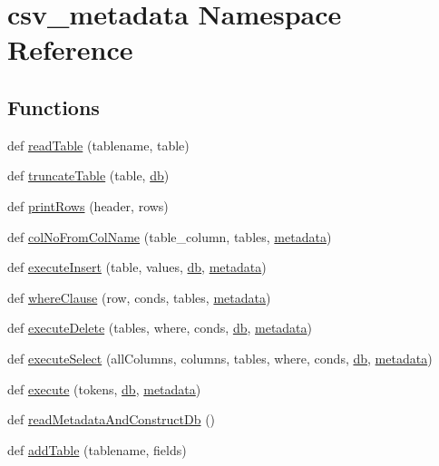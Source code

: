 \hypertarget{namespacecsv__metadata}{}\section{csv\+\_\+metadata Namespace Reference}
\label{namespacecsv__metadata}
\subsection*{Functions}
\begin{DoxyCompactItemize}
\item 
def \hyperlink{namespacecsv__metadata_ac1ac1f24352a53dae0ae96ad9872985f}{read\+Table} (tablename, table)
\item 
def \hyperlink{namespacecsv__metadata_a06957542212e3a336b9361143daf14a1}{truncate\+Table} (table, \hyperlink{namespacecsv__metadata_a420b92194841cb3f4c75f0a5e3d9b11a}{db})
\item 
def \hyperlink{namespacecsv__metadata_ab69f9a99263ae7a98c70f260c7070a1e}{print\+Rows} (header, rows)
\item 
def \hyperlink{namespacecsv__metadata_a8cbfbdd517a676ba5fe17575e341226f}{col\+No\+From\+Col\+Name} (table\+\_\+column, tables, \hyperlink{namespacecsv__metadata_aaa78faa581bc02a7969a61a25e9fe02d}{metadata})
\item 
def \hyperlink{namespacecsv__metadata_a070fb77f6306fe96fd6e0b480c261588}{execute\+Insert} (table, values, \hyperlink{namespacecsv__metadata_a420b92194841cb3f4c75f0a5e3d9b11a}{db}, \hyperlink{namespacecsv__metadata_aaa78faa581bc02a7969a61a25e9fe02d}{metadata})
\item 
def \hyperlink{namespacecsv__metadata_addd1fcf6b5c68e32a7383da138984b6b}{where\+Clause} (row, conds, tables, \hyperlink{namespacecsv__metadata_aaa78faa581bc02a7969a61a25e9fe02d}{metadata})
\item 
def \hyperlink{namespacecsv__metadata_acf210ad5cfd8151711d4b50dbf0fd248}{execute\+Delete} (tables, where, conds, \hyperlink{namespacecsv__metadata_a420b92194841cb3f4c75f0a5e3d9b11a}{db}, \hyperlink{namespacecsv__metadata_aaa78faa581bc02a7969a61a25e9fe02d}{metadata})
\item 
def \hyperlink{namespacecsv__metadata_a9d699f6d8e090d60632fb855549bb323}{execute\+Select} (all\+Columns, columns, tables, where, conds, \hyperlink{namespacecsv__metadata_a420b92194841cb3f4c75f0a5e3d9b11a}{db}, \hyperlink{namespacecsv__metadata_aaa78faa581bc02a7969a61a25e9fe02d}{metadata})
\item 
def \hyperlink{namespacecsv__metadata_aac9c3c471792496f745fad65e66edbb4}{execute} (tokens, \hyperlink{namespacecsv__metadata_a420b92194841cb3f4c75f0a5e3d9b11a}{db}, \hyperlink{namespacecsv__metadata_aaa78faa581bc02a7969a61a25e9fe02d}{metadata})
\item 
def \hyperlink{namespacecsv__metadata_a5617bb133a371783a096269046010cc5}{read\+Metadata\+And\+Construct\+Db} ()
\item 
def \hyperlink{namespacecsv__metadata_a2971e98c22418db43c41bb68c995bd6d}{add\+Table} (tablename, fields)
\end{DoxyCompactItemize}
